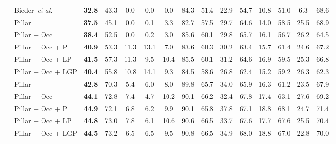 \documentclass[lettersize,journal]{IEEEtran}
\begin{document}
\begin{table*}[!t]
{\begin{tabular}{ll | c | cccccccccccc}
\midrule
{}
& Bieder~\textit{et al.}~\cite{bieder2020exploiting}          & \textbf{32.8} & 43.3 & 0.0 & 0.0 & 0.0 & 84.3 & 51.4 & 22.9 & 54.7 & 10.8 & 51.0 & 6.3 & 68.6  \\
& Pillar~\cite{fei2021pillarsegnet}                 & \textbf{37.5} & 45.1 & 0.0 & 0.1 & 3.3 & 82.7 & 57.5 & 29.7 & 64.6 & 14.0 & 58.5 & 25.5 & 68.9   \\
& Pillar + Occ~\cite{fei2021pillarsegnet}  & \textbf{38.4} & 52.5 & 0.0 & 0.2 & 3.0 & 85.6 & 60.1 & 29.8 & 65.7 & 16.1 & 56.7 & 26.2 & 64.5   \\
& Pillar + Occ + P & \textbf{40.9} &  53.3& 11.3 & 13.1 & 7.0 & 83.6 & 60.3 & 30.2 & 63.4 & 15.7 & 61.4 & 24.6 & 67.2   \\
& Pillar + Occ + LP  & \textbf{41.5} &  57.3& 11.3 & 9.5 & 10.4 & 85.5 & 60.1 & 31.2 & 64.6 & 16.9 & 59.5 & 25.3 & 66.8   \\
& Pillar + Occ + LGP  & \textbf{40.4} &  55.8& 10.8 & 14.1 & 9.3 & 84.5 & 58.6 & 26.8 & 62.4 & 15.2 & 59.2 & 26.3 & 62.3   \\
\midrule
{}
& Pillar~\cite{fei2021pillarsegnet}                 & \textbf{42.8} & 70.3 & 5.4 & 6.0 & 8.0  & 89.8 & 65.7 & 34.0 & 65.9 & 16.3 & 61.2 & 23.5 & 67.9   \\
& Pillar + Occ~\cite{fei2021pillarsegnet}  & \textbf{44.1} & 72.8 & 7.4 & 4.7 & 10.2 & 90.1 & 66.2 & 32.4 & 67.8 & 17.4 & 63.1 & 27.6 & 69.2   \\
& Pillar + Occ + P  & \textbf{44.9} & 72.1 & 6.8 & 6.2 & 9.9 & 90.1 & 65.8 & 37.8 & 67.1 & 18.8 & 68.1 & 24.7 & 71.4   \\
& Pillar + Occ + LP  & \textbf{44.8} &  73.0& 7.8 & 6.1 & 10.6 & 90.6 & 66.5 & 33.7 & 67.6 & 17.7 & 67.6 & 25.5 & 70.4   \\
& Pillar + Occ + LGP  & \textbf{44.5} &  73.2 & 6.5 & 6.5 & 9.5 & 90.8 & 66.5 & 34.9 & 68.0 & 18.8 & 67.0& 22.8 & 70.0   \\
\bottomrule
\end{tabular}}
\end{table*}
\end{document}
